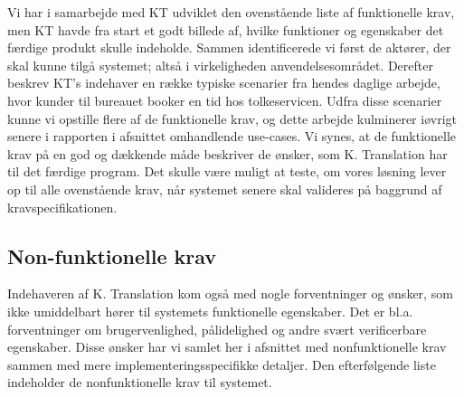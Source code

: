 \documentclass[12pt]{article}   %
\begin{document}
Vi har i samarbejde med KT udviklet den ovenstående liste af funktionelle
krav, men KT havde fra start et godt billede af, hvilke funktioner og egenskaber det
færdige produkt skulle indeholde. Sammen identificerede vi først de aktører, der skal 
kunne tilgå systemet; altså i virkeligheden anvendelsesområdet. Derefter
beskrev KT's indehaver en række typiske scenarier fra hendes daglige arbejde,
hvor kunder til bureauet booker en tid hos tolkeservicen. Udfra disse
scenarier kunne vi opstille flere af de funktionelle krav, og dette arbejde
kulminerer iøvrigt senere i rapporten i afsnittet omhandlende use-cases. Vi
synes, at de funktionelle krav på en god og dækkende måde beskriver de
ønsker, som K. Translation har til det færdige program. Det skulle være
muligt at teste, om vores løsning lever op til alle ovenstående krav, når
systemet senere skal valideres på baggrund af kravspecifikationen.  \\ 



\subsection{Non-funktionelle krav}
Indehaveren af K. Translation kom også med nogle forventninger og ønsker, som
ikke umiddelbart hører til systemets funktionelle egenskaber. Det er bl.a.
forventninger om brugervenlighed, pålidelighed og andre svært verificerbare
egenskaber. Disse ønsker har vi samlet her i afsnittet med nonfunktionelle
krav sammen med mere implementeringsspecifikke detaljer. Den efterfølgende liste
indeholder de nonfunktionelle krav til systemet.\\
\end{document}
